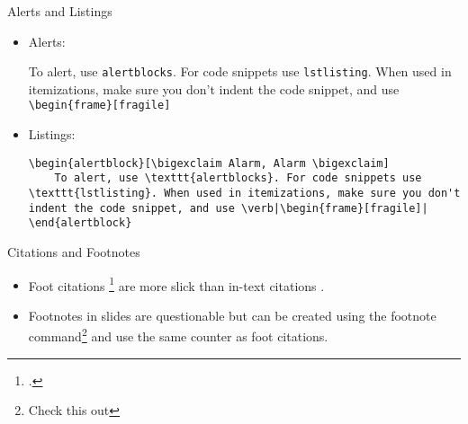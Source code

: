 \documentclass{beamer}
\begin{document}
\begin{frame}[fragile]{Alerts and Listings}
\begin{itemize}
	\item Alerts:
	\begin{alertblock}
		To alert, use \texttt{alertblocks}. For code snippets use \texttt{lstlisting}. When used in itemizations, make sure you don't indent the code snippet, and use \verb|\begin{frame}[fragile]|
	\end{alertblock}
\item Listings:
	\begin{lstlisting}
\begin{alertblock}[\bigexclaim Alarm, Alarm \bigexclaim]
	To alert, use \texttt{alertblocks}. For code snippets use \texttt{lstlisting}. When used in itemizations, make sure you don't indent the code snippet, and use \verb|\begin{frame}[fragile]|
\end{alertblock}
	\end{lstlisting}
\end{itemize}
\end{frame}

\begin{frame}{Citations and Footnotes}
\begin{itemize}
	\item Foot citations \footcite{AdamsFournier2003} are more slick than in-text citations \citep{AdamsFournier2003}.

	\item Footnotes in slides are questionable but can be created using the footnote command\footnote{Check this out} and use the same counter as foot citations.
\end{itemize}
\end{frame}
\end{document}
